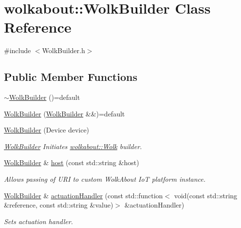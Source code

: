 \hypertarget{classwolkabout_1_1_wolk_builder}{}\section{wolkabout\+:\+:Wolk\+Builder Class Reference}
\label{classwolkabout_1_1_wolk_builder}


{\ttfamily \#include $<$Wolk\+Builder.\+h$>$}

\subsection*{Public Member Functions}
\begin{DoxyCompactItemize}
\item 
\hyperlink{classwolkabout_1_1_wolk_builder_a7507855f5fcb9f8d7eefc15b6daa63e6}{$\sim$\+Wolk\+Builder} ()=default
\item 
\hyperlink{classwolkabout_1_1_wolk_builder_a9ecf16fb262b7b703ceaeb735ca1aaf7}{Wolk\+Builder} (\hyperlink{classwolkabout_1_1_wolk_builder}{Wolk\+Builder} \&\&)=default
\item 
\hyperlink{classwolkabout_1_1_wolk_builder_a4bd7227f1e389a34e18cc77030dd7d84}{Wolk\+Builder} (Device device)
\begin{DoxyCompactList}\small\item\em \hyperlink{classwolkabout_1_1_wolk_builder}{Wolk\+Builder} Initiates \hyperlink{classwolkabout_1_1_wolk}{wolkabout\+::\+Wolk} builder. \end{DoxyCompactList}\item 
\hyperlink{classwolkabout_1_1_wolk_builder}{Wolk\+Builder} \& \hyperlink{classwolkabout_1_1_wolk_builder_a208c0a0d397efd615863ec1ea4f38f71}{host} (const std\+::string \&host)
\begin{DoxyCompactList}\small\item\em Allows passing of U\+RI to custom Wolk\+About IoT platform instance. \end{DoxyCompactList}\item 
\hyperlink{classwolkabout_1_1_wolk_builder}{Wolk\+Builder} \& \hyperlink{classwolkabout_1_1_wolk_builder_a5c8799ad21b6bb0f0c866af3295a69b7}{actuation\+Handler} (const std\+::function$<$ void(const std\+::string \&reference, const std\+::string \&value)$>$ \&actuation\+Handler)
\begin{DoxyCompactList}\small\item\em Sets actuation handler. \end{DoxyCompactList}\item 

\end{DoxyCompactItemize}
